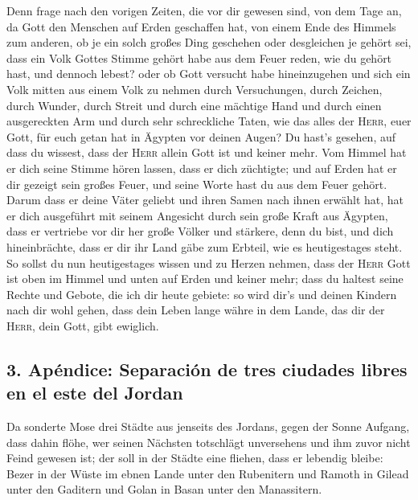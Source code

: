  Denn frage nach den vorigen Zeiten, die vor dir gewesen
sind, von dem Tage an, da Gott den Menschen auf Erden geschaffen hat,
von einem Ende des Himmels zum anderen, ob je ein solch großes Ding
geschehen oder desgleichen je gehört sei,  dass ein Volk
Gottes Stimme gehört habe aus dem Feuer reden, wie du gehört hast, und
dennoch lebest?  oder ob Gott versucht habe hineinzugehen
und sich ein Volk mitten aus einem Volk zu nehmen durch Versuchungen,
durch Zeichen, durch Wunder, durch Streit und durch eine mächtige Hand
und durch einen ausgereckten Arm und durch sehr schreckliche Taten, wie
das alles der \textsc{Herr}, euer Gott, für euch getan hat in Ägypten
vor deinen Augen?  Du hast's gesehen, auf dass du
wissest, dass der \textsc{Herr} allein Gott ist und keiner mehr.
 Vom Himmel hat er dich seine Stimme hören lassen, dass
er dich züchtigte; und auf Erden hat er dir gezeigt sein großes Feuer,
und seine Worte hast du aus dem Feuer gehört.  Darum dass
er deine Väter geliebt und ihren Samen nach ihnen erwählt hat, hat er
dich ausgeführt mit seinem Angesicht durch sein große Kraft aus Ägypten,
 dass er vertriebe vor dir her große Völker und stärkere,
denn du bist, und dich hineinbrächte, dass er dir ihr Land gäbe zum
Erbteil, wie es heutigestages steht.  So sollst du nun
heutigestages wissen und zu Herzen nehmen, dass der \textsc{Herr} Gott
ist oben im Himmel und unten auf Erden und keiner mehr; 
dass du haltest seine Rechte und Gebote, die ich dir heute gebiete: so
wird dir's und deinen Kindern nach dir wohl gehen, dass dein Leben lange
währe in dem Lande, das dir der \textsc{Herr}, dein Gott, gibt ewiglich.

\hypertarget{apuxe9ndice-separaciuxf3n-de-tres-ciudades-libres-en-el-este-del-jordan}{%
\subsection{3. Apéndice: Separación de tres ciudades libres en el este
del
Jordan}\label{apuxe9ndice-separaciuxf3n-de-tres-ciudades-libres-en-el-este-del-jordan}}

 Da sonderte Mose drei Städte aus jenseits des Jordans,
gegen der Sonne Aufgang,  dass dahin flöhe, wer seinen
Nächsten totschlägt unversehens und ihm zuvor nicht Feind gewesen ist;
der soll in der Städte eine fliehen, dass er lebendig bleibe:
 Bezer in der Wüste im ebnen Lande unter den Rubenitern
und Ramoth in Gilead unter den Gaditern und Golan in Basan unter den
Manassitern.

